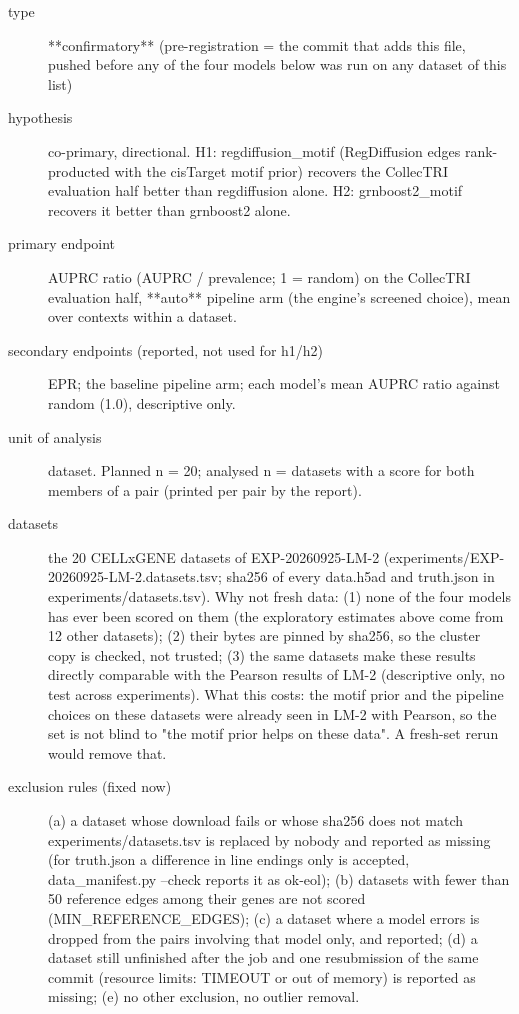 \documentclass{article}
\begin{document}
\begin{description}
\item[type] **confirmatory** (pre-registration = the commit that adds this file, pushed before any of the four models below was run on any dataset of this list)
\item[hypothesis] co-primary, directional. H1: regdiffusion\_motif (RegDiffusion edges rank-producted with the cisTarget motif prior) recovers the CollecTRI evaluation half better than regdiffusion alone. H2: grnboost2\_motif recovers it better than grnboost2 alone.
\item[primary endpoint] AUPRC ratio (AUPRC / prevalence; 1 = random) on the CollecTRI evaluation half, **auto** pipeline arm (the engine's screened choice), mean over contexts within a dataset.
\item[secondary endpoints (reported, not used for h1/h2)] EPR; the baseline pipeline arm; each model's mean AUPRC ratio against random (1.0), descriptive only.
\item[unit of analysis] dataset. Planned n = 20; analysed n = datasets with a score for both members of a pair (printed per pair by the report).
\item[datasets] the 20 CELLxGENE datasets of EXP-20260925-LM-2 (experiments/EXP-20260925-LM-2.datasets.tsv; sha256 of every data.h5ad and truth.json in experiments/datasets.tsv). Why not fresh data: (1) none of the four models has ever been scored on them (the exploratory estimates above come from 12 other datasets); (2) their bytes are pinned by sha256, so the cluster copy is checked, not trusted; (3) the same datasets make these results directly comparable with the Pearson results of LM-2 (descriptive only, no test across experiments). What this costs: the motif prior and the pipeline choices on these datasets were already seen in LM-2 with Pearson, so the set is not blind to "the motif prior helps on these data". A fresh-set rerun would remove that.
\item[exclusion rules (fixed now)] (a) a dataset whose download fails or whose sha256 does not match experiments/datasets.tsv is replaced by nobody and reported as missing (for truth.json a difference in line endings only is accepted, data\_manifest.py --check reports it as ok-eol); (b) datasets with fewer than 50 reference edges among their genes are not scored (MIN\_REFERENCE\_EDGES); (c) a dataset where a model errors is dropped from the pairs involving that model only, and reported; (d) a dataset still unfinished after the job and one resubmission of the same commit (resource limits: TIMEOUT or out of memory) is reported as missing; (e) no other exclusion, no outlier removal.

\end{description}
\end{document}
